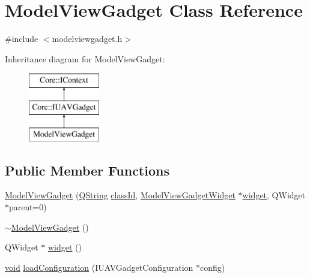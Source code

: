 \hypertarget{class_model_view_gadget}{\section{\-Model\-View\-Gadget \-Class \-Reference}
\label{class_model_view_gadget}
}


{\ttfamily \#include $<$modelviewgadget.\-h$>$}

\-Inheritance diagram for \-Model\-View\-Gadget\-:\begin{figure}[H]
\begin{center}
\leavevmode
\includegraphics[height=3.000000cm]{class_model_view_gadget}
\end{center}
\end{figure}
\subsection*{\-Public \-Member \-Functions}
\begin{DoxyCompactItemize}
\item 
\hyperlink{group___model_view_plugin_ga411c180daebc524f226c60cef529bcd4}{\-Model\-View\-Gadget} (\hyperlink{group___u_a_v_objects_plugin_gab9d252f49c333c94a72f97ce3105a32d}{\-Q\-String} \hyperlink{group___core_plugin_ga3878fde66a57220608960bcc3fbeef2c}{class\-Id}, \hyperlink{class_model_view_gadget_widget}{\-Model\-View\-Gadget\-Widget} $\ast$\hyperlink{group___model_view_plugin_ga9240ecd7243b93f3188923a7a28926b1}{widget}, \-Q\-Widget $\ast$parent=0)
\item 
\hyperlink{group___model_view_plugin_ga0b914fe76448332e8f22649b75984f4d}{$\sim$\-Model\-View\-Gadget} ()
\item 
\-Q\-Widget $\ast$ \hyperlink{group___model_view_plugin_ga9240ecd7243b93f3188923a7a28926b1}{widget} ()
\item 
\hyperlink{group___u_a_v_objects_plugin_ga444cf2ff3f0ecbe028adce838d373f5c}{void} \hyperlink{group___model_view_plugin_gae2075c43d77a6afba12fa43cbda0af36}{load\-Configuration} (\-I\-U\-A\-V\-Gadget\-Configuration $\ast$config)
\end{DoxyCompactItemize}


